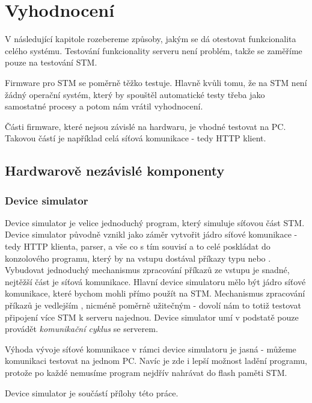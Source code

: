 

\chapter{Vyhodnocení}
V následující kapitole rozebereme způsoby, jakým se dá otestovat funkcionalita celého systému.
Testování funkcionality serveru není problém, takže se zaměříme pouze na testování STM.

Firmware pro STM se poměrně těžko testuje.
Hlavně kvůli tomu, že na STM není žádný operační systém, který by spouštěl automatické testy třeba jako
samostatné procesy a potom nám vrátil vyhodnocení.


Části firmware, které nejsou závislé na hardwaru, je vhodné testovat na PC.
Takovou částí je například celá síťová komunikace - tedy HTTP klient.

\section{Hardwarově nezávislé komponenty}

\subsection{Device simulator}
Device simulator je velice jednoduchý program, který simuluje síťovou část STM.
Device simulator původně vznikl jako záměr vytvořit jádro síťové komunikace - tedy HTTP klienta,
parser, a vše co s tím souvisí a to celé poskládat do konzolového programu, který by na vstupu
dostával příkazy typu  nebo .
Vybudovat jednoduchý mechanismus zpracování příkazů ze vstupu je snadné, nejtěžší část je síťová
komunikace.
Hlavní  device simulatoru mělo být jádro síťové komunikace, které bychom mohli přímo použít
na STM.
Mechanismus zpracování příkazů je vedlejším , nicméně poměrně užitečným - dovolí nám
to totiž testovat připojení více STM k serveru najednou.
Device simulator umí v podstatě pouze provádět \emph{komunikační cyklus} se serverem.

Výhoda vývoje síťové komunikace v rámci device simulatoru je jasná - můžeme komunikaci testovat
na jednom PC.
Navíc je zde i lepší možnost ladění programu, protože po každé nemusíme program nejdřív nahrávat
do flash paměti STM.

Device simulator je součástí přílohy této práce.

